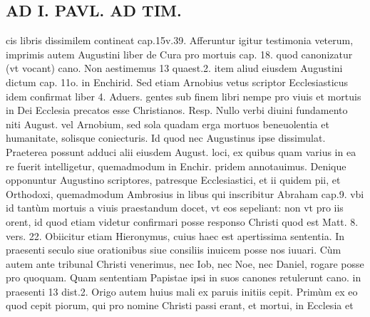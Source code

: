 \documentclass{article}
\begin{document}
\begin{pages}
\section*{AD I. PAVL. AD TIM. }
\marginpar{[ p.46 ]}\pstart cis libris dissimilem contineat cap.15v.39. Afferuntur igitur testimonia veterum, imprimis autem Augustini liber  de Cura pro mortuis cap. 18. quod canonizatur (vt vocant) cano. Non aestimemus 13 quaest.2. item aliud eiusdem Augustini dictum cap. 11o. in Enchirid. Sed etiam Arnobius vetus scriptor Ecclesiasticus idem confirmat liber  4. Aduers. gentes sub finem libri nempe pro viuis et mortuis in Dei Ecclesia precatos esse Christianos. Resp. Nullo verbi diuini fundamento niti August. vel Arnobium, sed sola quadam erga mortuos beneuolentia et humanitate, solisque coniecturis. Id quod nec Augustinus ipse dissimulat. Praeterea possunt adduci alii eiusdem August. loci, ex quibus quam varius in ea re fuerit intelligetur, quemadmodum in Enchir. pridem annotauimus. Denique opponuntur Augustino scriptores, patresque Ecclesiastici, et ii quidem pii, et Orthodoxi, quemadmodum Ambrosius in libus  qui inscribitur Abraham cap.9. vbi id tantùm mortuis a viuis praestandum docet, vt eos sepeliant: non vt pro iis orent, id quod etiam videtur confirmari posse responso Christi quod est Matt. 8. vers. 22. Obiicitur etiam Hieronymus, cuius haec est apertissima sententia. In praesenti seculo siue orationibus siue consiliis inuicem posse nos iuuari. Cùm autem ante tribunal Christi venerimus, nec Iob, nec Noe, nec Daniel, rogare posse pro quoquam. Quam sententiam Papistae ipsi in suos canones retulerunt cano. in praesenti 13 dist.2.  \pend\pstart Origo autem huius mali ex paruis initiis cepit. Primùm ex eo quod cepit piorum, qui pro nomine Christi passi erant, et mortui, in Ecclesia et  \pend

\end{pages}
\end{document}
